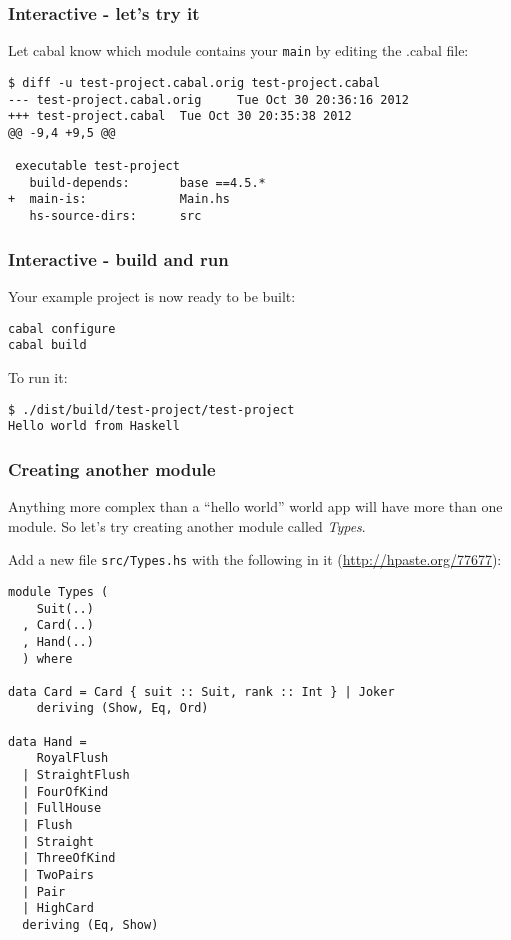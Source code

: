 \documentclass{beamer}
\begin{document}
\begin{frame}[fragile]
\frametitle{Interactive - let's try it}
Let cabal know which module contains your \verb+main+ by editing the .cabal file:

\begin{verbatim}
$ diff -u test-project.cabal.orig test-project.cabal
--- test-project.cabal.orig     Tue Oct 30 20:36:16 2012
+++ test-project.cabal  Tue Oct 30 20:35:38 2012
@@ -9,4 +9,5 @@

 executable test-project
   build-depends:       base ==4.5.*
+  main-is:             Main.hs
   hs-source-dirs:      src
\end{verbatim}

\end{frame}

\begin{frame}[fragile]
\frametitle{Interactive - build and run}

Your example project is now ready to be built:

\begin{verbatim}
cabal configure
cabal build
\end{verbatim}

To run it:
\begin{verbatim}
$ ./dist/build/test-project/test-project
Hello world from Haskell
\end{verbatim}

\end{frame}

\begin{frame}[fragile]
\frametitle{Creating another module}

Anything more complex than a ``hello world'' world app will have more
than one module.  So let's try creating another module called {\em Types}.

\bigskip
Add a new file \verb+src/Types.hs+ with the following in it
(\href{http://hpaste.org/77677}{http://hpaste.org/77677}):

{\tiny
\begin{verbatim}
module Types (
    Suit(..)
  , Card(..)
  , Hand(..)
  ) where

data Card = Card { suit :: Suit, rank :: Int } | Joker
    deriving (Show, Eq, Ord)

data Hand =
    RoyalFlush
  | StraightFlush
  | FourOfKind
  | FullHouse
  | Flush
  | Straight
  | ThreeOfKind
  | TwoPairs
  | Pair
  | HighCard
  deriving (Eq, Show)
\end{verbatim}
}

\end{frame}
\end{document}
